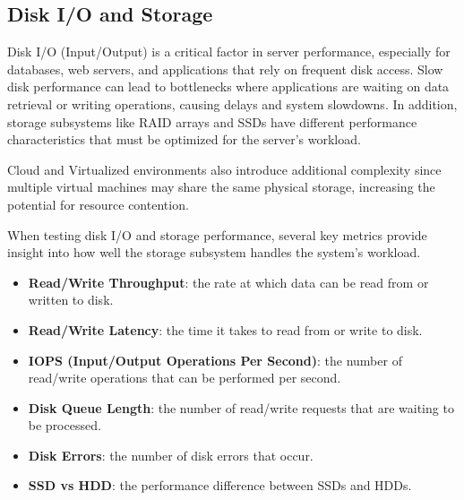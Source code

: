 \subsection{Disk I/O and Storage}

Disk I/O (Input/Output) is a critical factor in server
performance, especially for databases, web servers, and
applications that rely on frequent disk access. Slow disk
performance can lead to bottlenecks where applications
are waiting on data retrieval or writing operations,
causing delays and system slowdowns. In addition,
storage subsystems like RAID arrays and SSDs have
different performance characteristics that must be
optimized for the server’s workload.

Cloud and Virtualized environments also introduce additional complexity since
multiple virtual machines may share the same physical storage, increasing the
potential for resource contention.

When testing disk I/O and storage performance, several key metrics provide insight into how well the storage subsystem handles the system's workload.

\begin{itemize}
    \item \textbf{Read/Write Throughput}: the rate at which data can be read from or written to disk.
    \item \textbf{Read/Write Latency}: the time it takes to read from or write to disk.
    \item \textbf{IOPS (Input/Output Operations Per Second)}: the number of read/write operations that can be performed per second.
    \item \textbf{Disk Queue Length}: the number of read/write requests that are waiting to be processed.
    \item \textbf{Disk Errors}: the number of disk errors that occur.
    \item \textbf{SSD vs HDD}: the performance difference between SSDs and HDDs.
\end{itemize}


